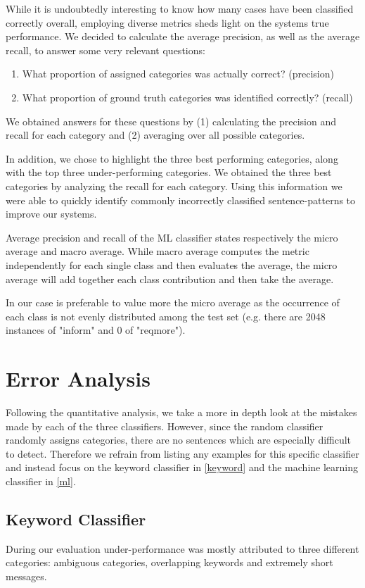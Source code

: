 \documentclass[a4paper]{article}
\begin{document}
While it is undoubtedly interesting to know how many cases have been classified correctly overall, employing diverse metrics sheds light on the systems true performance. We decided to calculate the average precision, as well as the average recall, to answer some very relevant questions:
\begin{enumerate}
    \item What proportion of assigned categories was actually correct? (precision)
    \item What proportion of ground truth categories was identified correctly? (recall)
\end{enumerate}{}
We obtained answers for these questions by (1) calculating the precision and recall for each category and (2) averaging over all possible categories.

In addition, we chose to highlight the three best performing categories, along with the top three under-performing categories. We obtained the three best categories by analyzing the recall for each category. Using this information we were able to quickly identify commonly incorrectly classified sentence-patterns to improve our systems.

Average precision and recall of the ML classifier states respectively the micro average and macro average.
While macro average computes the metric independently for each single class and then evaluates the average, the micro average will add together each class contribution and then take the average.

In our case is preferable to value more the micro average as the occurrence of each class is not evenly distributed among the test set (e.g. there are 2048 instances of "inform" and 0 of "reqmore").

\section{Error Analysis}
Following the quantitative analysis, we take a more in depth look at the mistakes made by each of the three classifiers. However, since the random classifier randomly assigns categories, there are no sentences which are especially difficult to detect. Therefore we refrain from listing any examples for this specific classifier and instead focus on the keyword classifier in \autoref{keyword} and the machine learning classifier in \autoref{ml}.

\subsection{Keyword Classifier}
\label{keyword}
During our evaluation under-performance was mostly attributed to three different categories: ambiguous categories, overlapping keywords and extremely short messages.
\end{document}
